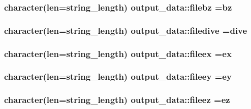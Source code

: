 \subsubsection[{\texorpdfstring{filebz}{filebz}}]{\setlength{\rightskip}{0pt plus 5cm}character(len=string\+\_\+length) output\+\_\+data\+::filebz =\textquotesingle{}bz\textquotesingle{}}\hypertarget{namespaceoutput__data_a07a77b208c10f32c5723378f16ea4301}{}\label{namespaceoutput__data_a07a77b208c10f32c5723378f16ea4301}
\subsubsection[{\texorpdfstring{filedive}{filedive}}]{\setlength{\rightskip}{0pt plus 5cm}character(len=string\+\_\+length) output\+\_\+data\+::filedive =\textquotesingle{}dive\textquotesingle{}}\hypertarget{namespaceoutput__data_a655183a11c6badb83f94a4f05b94f95e}{}\label{namespaceoutput__data_a655183a11c6badb83f94a4f05b94f95e}
\subsubsection[{\texorpdfstring{fileex}{fileex}}]{\setlength{\rightskip}{0pt plus 5cm}character(len=string\+\_\+length) output\+\_\+data\+::fileex =\textquotesingle{}ex\textquotesingle{}}\hypertarget{namespaceoutput__data_aa8d95fb60904ef94d39d3c06ebc6d4d7}{}\label{namespaceoutput__data_aa8d95fb60904ef94d39d3c06ebc6d4d7}
\subsubsection[{\texorpdfstring{fileey}{fileey}}]{\setlength{\rightskip}{0pt plus 5cm}character(len=string\+\_\+length) output\+\_\+data\+::fileey =\textquotesingle{}ey\textquotesingle{}}\hypertarget{namespaceoutput__data_a368d30c58c5484d6e8caf5e536d2da0c}{}\label{namespaceoutput__data_a368d30c58c5484d6e8caf5e536d2da0c}
\subsubsection[{\texorpdfstring{fileez}{fileez}}]{\setlength{\rightskip}{0pt plus 5cm}character(len=string\+\_\+length) output\+\_\+data\+::fileez =\textquotesingle{}ez\textquotesingle{}}\hypertarget{namespaceoutput__data_ab01ba0f2c67ee55da96a855e8da8382c}{}\label{namespaceoutput__data_ab01ba0f2c67ee55da96a855e8da8382c}
